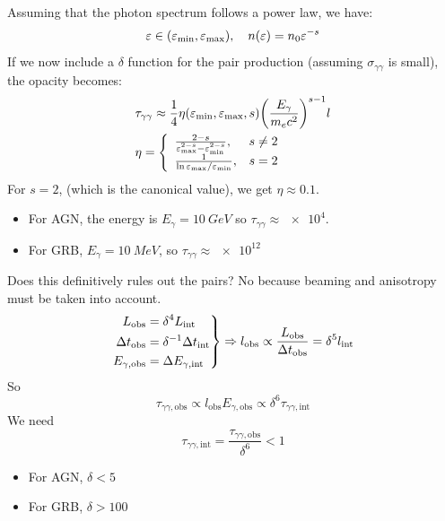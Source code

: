 \documentclass[10pt,a4paper,english]{article}
\let\originalleft\left
\let\originalright\right
\renewcommand{\left}{\mathopen{}\mathclose\bgroup\originalleft}
\renewcommand{\right}{\aftergroup\egroup\originalright}
\begin{document}
Assuming that the photon spectrum follows a power law, we have:
\begin{equation}
  \varepsilon \in \left( \varepsilon_\mathrm{min}, \varepsilon_\mathrm{max} \right),\quad n(\varepsilon) = n_0 \varepsilon^{-s}
\end{equation}
If we now include a $\delta$ function for the pair production
(assuming $\sigma_{\gamma\gamma}$ is small), the opacity becomes:
\begin{align}
  & \tau_{\gamma\gamma} \approx \frac{1}{4}\eta \left( \varepsilon_\mathrm{min}, \varepsilon_\mathrm{max}, s \right) \left( \frac{E_\gamma}{m_ec^2} \right)^{s-1} l \\
  & \eta = \left\lbrace
    \begin{array}{lr}
      \frac{2-s}{\varepsilon_\mathrm{max}^{2-s} - \varepsilon_\mathrm{min}^{2-s}}, & s\neq 2 \\
      \frac{1}{\ln\varepsilon_\mathrm{max}/\varepsilon_\mathrm{min}}, & s = 2
    \end{array}\right.
\end{align}
For $s=2$, (which is the canonical value), we get $\eta \approx 0.1$.
\begin{itemize}
\item For AGN, the energy is $E_\gamma = \SI{10}{GeV}$ so
  $\tau_{\gamma\gamma} \approx \num{e4}$.
\item For GRB, $E_\gamma = \SI{10}{MeV}$, so
  $\tau_{\gamma\gamma} \approx \num{e12}$
\end{itemize}
Does this definitively rules out the pairs? No because beaming and
anisotropy must be taken into account.
\begin{equation}
  \left.\begin{split}
      L_\mathrm{obs} & = \delta^4L_\mathrm{int} \\
      \Delta t_\mathrm{obs} & = \delta^{-1} \Delta t_\mathrm{int} \\
      E_{\gamma,\mathrm{obs}} & = \Delta E_{\gamma,\mathrm{int}}
    \end{split}\right\rbrace
  \Rightarrow l_\mathrm{obs} \propto \frac{L_\mathrm{obs}}{\Delta t_\mathrm{obs}} = \delta^5 l_\mathrm{int}
\end{equation}
So
\begin{equation}
  \tau_{\gamma\gamma,\mathrm{obs}} \propto l_\mathrm{obs} E_{\gamma,\mathrm{obs}} \propto \delta^6\tau_{\gamma\gamma,\mathrm{int}}
\end{equation}
We need
\begin{equation}
  \tau_{\gamma\gamma,\mathrm{int}} = \frac{\tau_{\gamma\gamma,\mathrm{obs}}}{\delta^6} < 1
\end{equation}
\begin{itemize}
\item For AGN, $\delta < 5$
\item For GRB, $\delta > 100$
\end{itemize}
\end{document}
